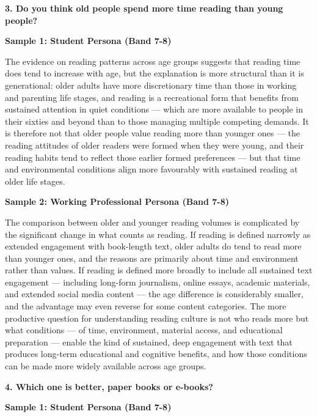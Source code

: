 \begin{ieltsquestion}
\textbf{3. Do you think old people spend more time reading than young people?}
\end{ieltsquestion}
\textbf{Sample 1: Student Persona (Band 7-8)}

The evidence on reading patterns across age groups suggests that reading time does tend to increase with age, but the explanation is more structural than it is generational: older adults have more discretionary time than those in working and parenting life stages, and reading is a recreational form that benefits from sustained attention in quiet conditions — which are more available to people in their sixties and beyond than to those managing multiple competing demands. It is therefore not that older people value reading more than younger ones — the reading attitudes of older readers were formed when they were young, and their reading habits tend to reflect those earlier formed preferences — but that time and environmental conditions align more favourably with sustained reading at older life stages.

\textbf{Sample 2: Working Professional Persona (Band 7-8)}

The comparison between older and younger reading volumes is complicated by the significant change in what counts as reading. If reading is defined narrowly as extended engagement with book-length text, older adults do tend to read more than younger ones, and the reasons are primarily about time and environment rather than values. If reading is defined more broadly to include all sustained text engagement — including long-form journalism, online essays, academic materials, and extended social media content — the age difference is considerably smaller, and the advantage may even reverse for some content categories. The more productive question for understanding reading culture is not who reads more but what conditions — of time, environment, material access, and educational preparation — enable the kind of sustained, deep engagement with text that produces long-term educational and cognitive benefits, and how those conditions can be made more widely available across age groups.

\separator

\begin{ieltsquestion}
\textbf{4. Which one is better, paper books or e-books?}
\end{ieltsquestion}
\textbf{Sample 1: Student Persona (Band 7-8)}

